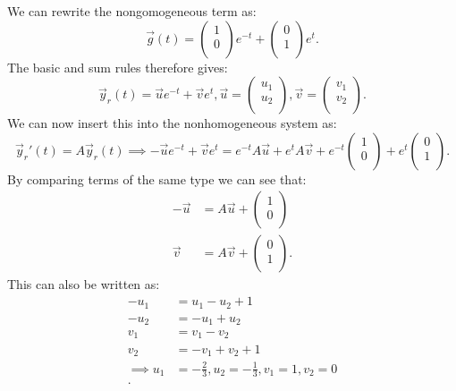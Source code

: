 We can rewrite the nongomogeneous term as:
\[ 
\Vec{g}(t) = \begin{pmatrix}
1\\
0\\
\end{pmatrix} e^{-t} + \begin{pmatrix}
0\\
1\\
\end{pmatrix} e^{t}
.\]
The basic and sum rules therefore gives:
\[ 
\Vec{y}_r(t) = \Vec{u} e^{-t} + \Vec{v} e^{t}, \Vec{u} = \begin{pmatrix}
u_1\\
u_2\\
\end{pmatrix}, \Vec{v} = \begin{pmatrix}
v_1\\
v_2\\
\end{pmatrix}
.\]
We can now insert this into the nonhomogeneous system as:
\[ 
\Vec{y}_r'(t) = A \Vec{y}_r(t) \implies - \Vec{u} e^{-t} + \Vec{v} e^{t} = e^{-t} A \Vec{u} + e^{t} A \Vec{v} + e^{-t} \begin{pmatrix}
1\\
0\\
\end{pmatrix} + e^{t} \begin{pmatrix}
0\\
1\\
\end{pmatrix}
.\]
By comparing terms of the same type we can see that:
\begin{align*}
  - \Vec{u} &= A \Vec{u} + \begin{pmatrix}
  1\\
  0\\
  \end{pmatrix} \\
    \Vec{v} &= A \Vec{v} + \begin{pmatrix}
    0\\
    1\\
    \end{pmatrix}
.\end{align*}
This can also be written as:
\begin{align*}
  -u_1 &= u_1 - u_2 + 1  \\
  -u_2 &= -u_1 + u_2 \\
  v_1 &= v_1 - v_2 \\
  v_2 &= -v_1 + v_2 + 1 \\
  \implies u_1 &= -\frac{2}{3}, u_2 = -\frac{1}{3}, v_1 = 1, v_2 = 0 \\
.\end{align*}

